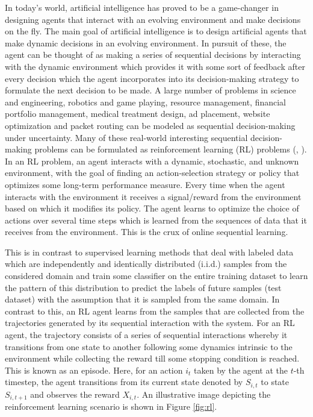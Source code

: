 In today's world, artificial intelligence has proved to be a game-changer in designing agents that interact with an evolving environment and make decisions on the fly. The main goal of artificial intelligence is to design artificial agents that make dynamic decisions in an evolving environment. In pursuit of these, the agent can be thought of as making a series of sequential decisions by interacting with the dynamic environment which provides it with some sort of feedback after every decision which the agent incorporates into its decision-making strategy to formulate the next decision to be made. A large number of problems in science and engineering, robotics and game playing, resource management, financial portfolio management, medical treatment design, ad placement, website optimization and packet routing can be modeled as sequential decision-making under uncertainty. Many of these real-world interesting
sequential decision-making problems can be formulated as reinforcement learning (RL) problems (\citep{bertsekas1996neuro}, \citep{sutton1998reinforcement}). In an RL problem, an agent interacts with a dynamic, stochastic, and unknown environment, with the goal of finding an action-selection strategy or policy that optimizes some long-term performance measure. Every time when the agent interacts with the environment it receives a signal/reward from the environment based on which it modifies its policy. The agent learns to optimize the choice of actions over several time steps which is learned from the sequences of data that it receives from the environment. This is the crux of online sequential learning. 

    This is in contrast to supervised learning methods that deal with labeled data which are independently and identically distributed (i.i.d.) samples from the considered domain and train some classifier on the entire training dataset to learn the pattern of this distribution to predict the labels of future samples (test dataset) with the assumption that it is sampled from the same domain. In contrast to this, an RL agent learns from the samples that are collected from the trajectories generated by its sequential interaction with the system. For an RL agent, the trajectory consists of a series of sequential interactions whereby it transitions from one state to another following some dynamics intrinsic to the environment while collecting the reward till some stopping condition is reached. This is known as an episode. Here, for an action $i_t$ taken by the agent at the $t$-th timestep, the agent transitions from its current state denoted by $S_{i,t}$ to state $S_{i,t+1}$ and observes the reward $X_{i,t}$. An illustrative image depicting the reinforcement learning scenario is shown in Figure \ref{fig:rl}.

